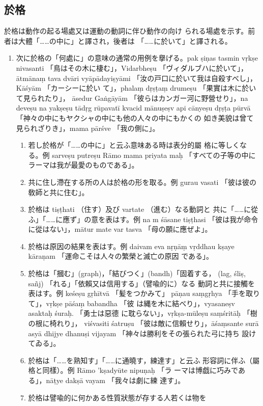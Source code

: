 \subsection{於格}
\numberParagraph
於格は動作の起る場處又は運動の動詞に伴ひ動作の向け
られる場處を示す。前者は大體「……の中に」と譯され，後者は
「……に於いて」と譯される。
\begin{enumerate}[label=(\arabic*)]
\item 次に於格の「何處に」の意味の通常の用例を擧げる。pak\-%
ṣiṇas tasmin vṛkṣe nivasanti 「鳥はその木に棲む」，Vidarbheṣu
「ヴィダルブハに於いて」，ātmānaṃ tava dvāri vyāpādayiṣyāmi
「汝の戸口に於いて我は自殺すべし」，Kāśyām 「カーシーに於い
て」，phalaṃ dṛṣṭaṃ drumeṣu 「果實は木に於いて見られたり」，
āsedur Gaṅgāyām 「彼らはカンガー河に野營せり」，na deveṣu na
yakṣeṣu tādṛg rūpavatī kvacid mānuṣeṣv api cānyeṣu dṛṣṭa\-%
pūrvā 「神々の中にもヤクシャの中にも他の人々の中にもかくの
如き美貌は曾て見られざりき」，mama pārśve 「我の側に」。
\begin{enumerate}[label=(\alph*)]
\item 若し於格が「……の中に」と云ふ意味ある時は表分的屬
格に等しくなる。例 sarveṣu putreṣu Rāmo mama priyata\-%
maḥ 「すべての子等の中にラーマは我が最愛のものである」。
\item 共に住し滯在する所の人は於格の形を取る。例 gurau
vasati 「彼は彼の敎師と共に住む」。
\item 於格は tiṣṭhati （住す）及び vartate （進む）なる動詞と
共に「……に從ふ」「……に應ず」の意を表はす。例 na m
śāsane tiṣṭhasi 「彼は我が命令に從はない」，mātur mate var\-%
tasva 「母の願に應ぜよ」。
\item 於格は原因の結果を表はす。例 daivam eva nṛṇāṃ
vṛddhau kṣaye kāraṇam 「運命こそは人々の繁榮と滅亡の原因
である」。
\item 於格は「摑む」(graph)，「結びつく」(bandh)「固着する，
(lag, śliṣ, sañj) 「れる」「依賴又は信用する」（譬喩的に）なる
動詞と共に接觸を表はす。例 keśeṣu gṛhītvā 「髪をつかみて」
pāṇau saṃgṛhya 「手を取りて」，vṛkṣe pāśaṃ babandha 「彼
は縄を木に結べり」，vyasaneṣv asaktaḥ śuraḥ. 「勇士は惡德
に耽らない」，vṛkṣa-mūleṣu saṃśritāḥ 「樹の根に椅れり」，
viśvasiti śatruṣu 「彼は敵に信賴せり」，āśaṃsante surā asyā\-%
dhijye dhanuṣi vijayam 「神々は勝利をその張られた弓に持ち
設けてゐる」。
\item 於格は「……を熟知す」「……に通曉す，練達す」と云ふ
形容詞に伴ふ（屬格と同樣）。例 Rāmo 'kṣadyūte nipuṇaḥ 「ラ
ーマは博戯に巧みである」，nāṭye dakṣā vayam 「我々は劇に練
達す」。
\item 於格は譬喩的に何かある性質狀態が存する人若くは物を

\end{enumerate}
\end{enumerate}
